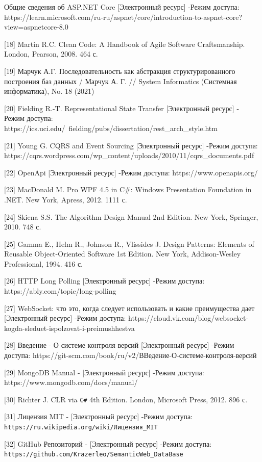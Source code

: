 \documentclass[12pt]{article}
\begin{document}
\begin{flushleft}
    [17] Общие сведения об ASP.NET Core [Электронный ресурс] -Режим доступа: https://learn.microsoft.com/ru-ru/aspnet/core/introduction-to-aspnet-core?view=aspnetcore-8.0

    [18] Martin R.C. Clean Code: A Handbook of Agile Software Craftsmanship. London, Pearson, 2008. 464 с.

    [19] Марчук А.Г. Последовательность как абстракция структурированного построения баз данных / Марчук А. Г. // System Informatics (Системная информатика), No. 18 (2021)

    [20] Fielding R.-T. Representational State Transfer [Электронный ресурс] - Режим доступа:  https://ics.uci.edu/~fielding/pubs/dissertation/rest\_arch\_style.htm

    [21] Young G. CQRS and Event Sourcing [Электронный ресурс] -Режим доступа: https://cqrs.wordpress.com/wp\_content/uploads/2010/11/cqrs\_documents.pdf

    [22] OpenApi [Электронный ресурс] -Режим доступа: https://www.openapis.org/

    [23] MacDonald M. Pro WPF 4.5 in C\#: Windows Presentation Foundation in .NET. New York, Apress, 2012. 1111 с.

    [24] Skiena S.S. The Algorithm Design Manual 2nd Edition. New York, Springer, 2010. 748 с.

    [25] Gamma E., Helm R., Johnson R., Vlissides J. Design Patterns: Elements of Reusable Object-Oriented Software 1st Edition. New York, Addison-Wesley Professional, 1994. 416 с.

    [26] HTTP Long Polling [Электронный ресурс] -Режим доступа: https://ably.com/topic/long-polling

    [27] WebSocket: что это, когда следует использовать и какие преимущества дает [Электронный ресурс] -Режим доступа: https://cloud.vk.com/blog/websocket-kogda-sleduet-ispolzovat-i-preimushhestva

    [28] Введение - О системе контроля версий [Электронный ресурс] -Режим доступа: https://git-scm.com/book/ru/v2/ВВедение-О-системе-контроля-версий

    [29] MongoDB Manual - [Электронный ресурс] -Режим доступа: https://www.mongodb.com/docs/manual/

    [30] Richter J. CLR via \verb|C#| 4th Edition. London, Microsoft Press, 2012. 896 с.

    [31] Лицензия MIT - [Электронный ресурс] -Режим доступа: \verb|https://ru.wikipedia.org/wiki/Лицензия_MIT|

    [32] GitHub Репозиторий - [Электронный ресурс] -Режим доступа: \verb| https://github.com/Krazerleo/SemanticWeb_DataBase|

\end{flushleft}
\end{document}
